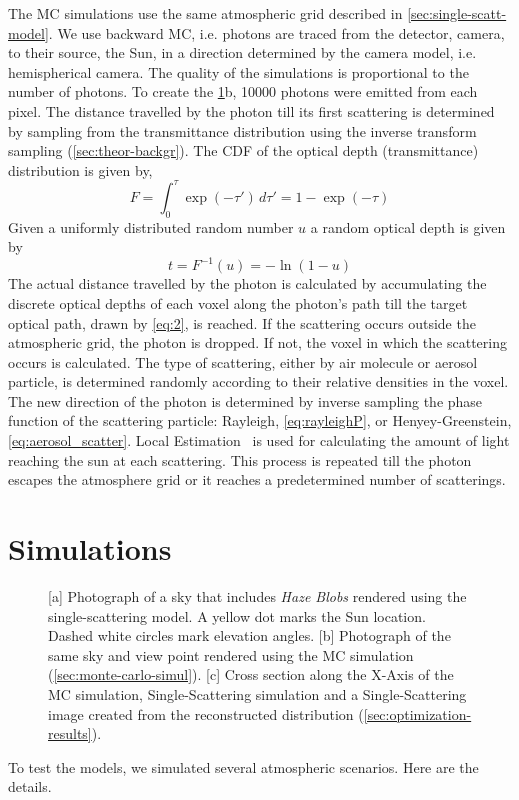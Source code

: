 \documentclass[10pt,letterpaper]{article}
\newcommand{\derivsym}[1]{\,d{#1}}
\newcommand{\yoavcomment}[1]{}
\renewcommand{\yoavcomment}[1]{#1} %
\begin{document}
The MC simulations use the same atmospheric grid described in
\cref{sec:single-scatt-model}. We use backward MC, i.e. photons are
traced from the detector, camera, to their source, the Sun, in a
direction determined by the camera model, i.e. hemispherical
camera. The quality of the simulations is proportional to the number
of photons. To create the \cref{fig:simulation-results1}b, \num{10000}
photons were emitted from each pixel. The distance travelled by the
photon till its first scattering is determined by sampling from the
transmittance distribution using the inverse transform sampling
(\cref{sec:theor-backgr}).  The CDF of the optical depth
(transmittance) distribution is given by,
\begin{equation}
  \label{eq:1}
  F=\int_{0}^{\tau}\exp(-\tau')\derivsym{\tau'}=1-\exp(-\tau)
\end{equation}
Given a uniformly distributed random number $u$ a random optical depth
is given by
\begin{equation}
  \label{eq:2}
  t=F^{-1}(u)=-\ln(1-u)
\end{equation}
The actual distance travelled by the photon is calculated by
accumulating the discrete optical depths of each voxel along the
photon's path till the target optical path, drawn by \cref{eq:2}, is
reached.  If the scattering occurs outside the atmospheric grid, the
photon is dropped. If not, the voxel in which the scattering occurs is
calculated.  The type of scattering, either by air molecule or aerosol
particle, is determined randomly according to their relative densities
in the voxel.  The new direction of the photon is determined by
inverse sampling the phase function of the scattering particle:
Rayleigh, \cref{eq:rayleighP}, or Henyey-Greenstein,
\cref{eq:aerosol_scatter}.  Local Estimation~\cite{marshak20053d} is
used for calculating the amount of light reaching the sun at each
scattering.  This process is repeated till the photon escapes the
atmosphere grid or it reaches a predetermined number of scatterings.


\section{Simulations}
\label{sec:simul}

\begin{figure}
  \centering
  \yoavcomment{\def\svgwidth{0.95\columnwidth}}
  \caption{\small [a] Photograph of a sky that includes {\em Haze
      Blobs} rendered using the single-scattering model.  A yellow dot
    marks the Sun location. Dashed white circles mark elevation
    angles.  [b] Photograph of the same sky and view point rendered
    using the MC simulation (\cref{sec:monte-carlo-simul}).  [c] Cross
    section along the X-Axis of the MC simulation, Single-Scattering
    simulation and a Single-Scattering image created from the
    reconstructed distribution (\cref{sec:optimization-results}).}
  \label{fig:simulation-results1}
\end{figure}
To test the models, we simulated several atmospheric scenarios. Here
are the details.
\end{document}
